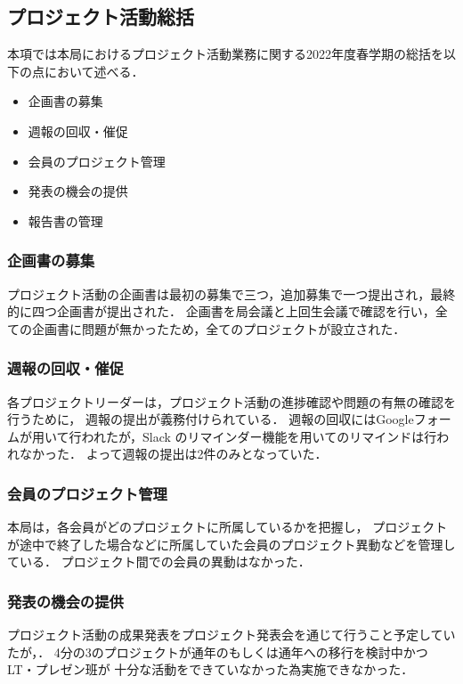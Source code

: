\subsection*{プロジェクト活動総括}


本項では本局におけるプロジェクト活動業務に関する2022年度春学期の総括を以下の点において述べる．

\begin{itemize}
\item 企画書の募集
\item 週報の回収・催促
\item 会員のプロジェクト管理
\item 発表の機会の提供
\item 報告書の管理
\end{itemize}

\subsubsection*{企画書の募集}

プロジェクト活動の企画書は最初の募集で三つ，追加募集で一つ提出され，最終的に四つ企画書が提出された．
企画書を局会議と上回生会議で確認を行い，全ての企画書に問題が無かったため，全てのプロジェクトが設立された．

\subsubsection*{週報の回収・催促}

各プロジェクトリーダーは，プロジェクト活動の進捗確認や問題の有無の確認を行うために，
週報の提出が義務付けられている．
週報の回収にはGoogleフォームが用いて行われたが，Slack のリマインダー機能を用いてのリマインドは行われなかった．
よって週報の提出は2件のみとなっていた．

\subsubsection*{会員のプロジェクト管理}

本局は，各会員がどのプロジェクトに所属しているかを把握し，
プロジェクトが途中で終了した場合などに所属していた会員のプロジェクト異動などを管理している．
プロジェクト間での会員の異動はなかった．

\subsubsection*{発表の機会の提供}

プロジェクト活動の成果発表をプロジェクト発表会を通じて行うこと予定していたが，．
4分の3のプロジェクトが通年のもしくは通年への移行を検討中かつLT・プレゼン班が
十分な活動をできていなかった為実施できなかった．　
